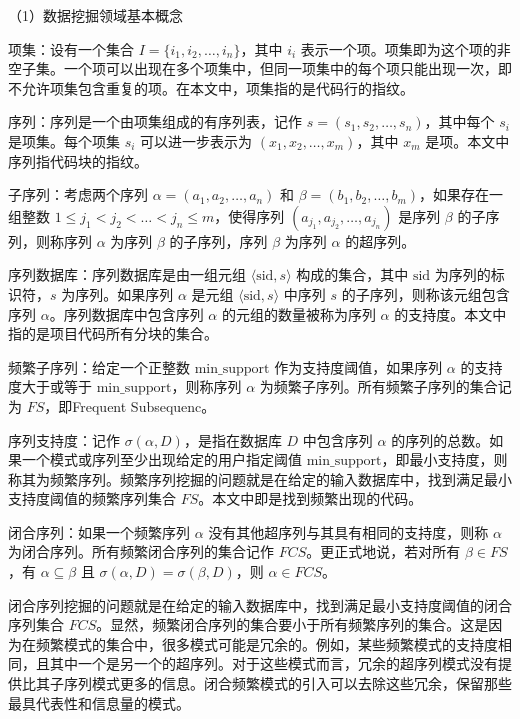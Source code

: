 （1）数据挖掘领域基本概念

项集\cite{2013ClaSP}：设有一个集合 \( I = \{i_1, i_2, \dots, i_n\} \)，其中 \( i_i \) 表示一个项。项集即为这个项的非空子集。一个项可以出现在多个项集中，但同一项集中的每个项只能出现一次，即不允许项集包含重复的项。在本文中，项集指的是代码行的指纹。

序列\cite{2013ClaSP}：序列是一个由项集组成的有序列表，记作 \( s = (s_1, s_2, \dots, s_n) \)，其中每个 \( s_i \) 是项集。每个项集 \( s_i \) 可以进一步表示为 \( (x_1, x_2, \dots, x_m) \)，其中 \( x_m \) 是项。本文中序列指代码块的指纹。

子序列\cite{2013ClaSP}：考虑两个序列 \( \alpha = (a_1, a_2, \dots, a_n) \) 和 \( \beta = (b_1, b_2, \dots, b_m) \)，如果存在一组整数 \( 1 \leq j_1 < j_2 < \dots < j_n \leq m \)，使得序列 \( (a_{j_1}, a_{j_2}, \dots, a_{j_n}) \) 是序列 \( \beta \) 的子序列，则称序列 \( \alpha \) 为序列 \( \beta \) 的子序列，序列 \( \beta \) 为序列 \( \alpha \) 的超序列。

序列数据库\cite{2013ClaSP}：序列数据库是由一组元组 \( \langle \text{sid}, s \rangle \) 构成的集合，其中 \( \text{sid} \) 为序列的标识符，\( s \) 为序列。如果序列 \( \alpha \) 是元组 \( \langle \text{sid}, s \rangle \) 中序列 \( s \) 的子序列，则称该元组包含序列 \( \alpha \)。序列数据库中包含序列 \( \alpha \) 的元组的数量被称为序列 \( \alpha \) 的支持度。本文中指的是项目代码所有分块的集合。

频繁子序列\cite{2013ClaSP}：给定一个正整数 \( \text{min\_support} \) 作为支持度阈值，如果序列 \( \alpha \) 的支持度大于或等于 \( \text{min\_support} \)，则称序列 \( \alpha \) 为频繁子序列。所有频繁子序列的集合记为 \( FS \)，即Frequent Subsequenc。


序列支持度：记作 \( \sigma(\alpha, D) \)，是指在数据库 \( D \) 中包含序列 \( \alpha \) 的序列的总数。如果一个模式或序列至少出现给定的用户指定阈值 \( \text{min\_support} \)，即最小支持度，则称其为频繁序列。频繁序列挖掘的问题就是在给定的输入数据库中，找到满足最小支持度阈值的频繁序列集合 \( FS \)。本文中即是找到频繁出现的代码。


闭合序列：如果一个频繁序列 \( \alpha \) 没有其他超序列与其具有相同的支持度，则称 \( \alpha \) 为闭合序列。所有频繁闭合序列的集合记作 \( FCS \)。更正式地说，若对所有 \( \beta \in FS \)，有 \( \alpha \subseteq \beta \) 且 \( \sigma(\alpha, D) = \sigma(\beta, D) \)，则 \( \alpha \in FCS \)。

闭合序列挖掘的问题就是在给定的输入数据库中，找到满足最小支持度阈值的闭合序列集合 \( FCS \)。显然，频繁闭合序列的集合要小于所有频繁序列的集合。这是因为在频繁模式的集合中，很多模式可能是冗余的。例如，某些频繁模式的支持度相同，且其中一个是另一个的超序列。对于这些模式而言，冗余的超序列模式没有提供比其子序列模式更多的信息。闭合频繁模式的引入可以去除这些冗余，保留那些最具代表性和信息量的模式。

